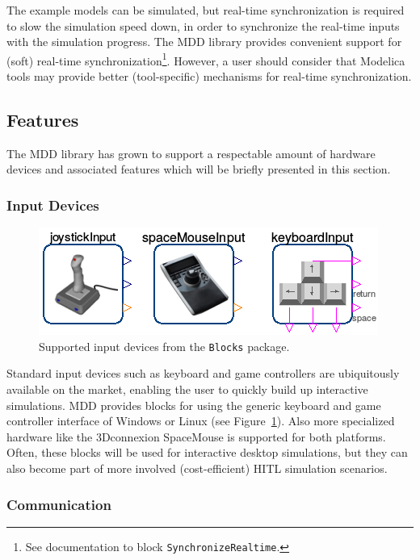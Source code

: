 \documentclass{resources/modelica}
\newcommand{\modelica}[1]{\lstinline[language=modelica]|#1|}
\begin{document}
\noindent
The example models can be simulated, but real-time synchronization is
required to slow the simulation speed down, in order to synchronize the
real-time inputs with the simulation progress.
The MDD library provides convenient support for (soft) real-time
synchronization\footnote{See documentation to block
\mbox{\modelica{SynchronizeRealtime}.}
}.
However, a user should consider that Modelica tools may provide better (tool-specific) mechanisms for real-time synchronization.

\subsection{Features}

The MDD library has grown to support a respectable amount of hardware devices
and associated features which will be briefly presented in this section.

\subsubsection{Input Devices}
\begin{figure}[htb]
  \centering
  \includegraphics[width=0.7\columnwidth]{figures/OverviewInputDevices}
  \caption{Supported input devices from the \modelica{Blocks} package.}
  \label{fig:OverviewInputDevices}
\end{figure}

\noindent
Standard input devices such as keyboard and game controllers are ubiquitously
available on the market, enabling the user to quickly build up interactive simulations.
MDD provides blocks for using the generic keyboard and game controller interface
of Windows or Linux (see Figure~\ref{fig:OverviewInputDevices}). Also more
specialized hardware like the 3Dconnexion SpaceMouse is supported for both platforms.
Often, these blocks will be used for interactive desktop simulations, but they
can also become part of more involved (cost-efficient) HITL simulation
scenarios.

\subsubsection{Communication}
\label{sec:Communication}
\end{document}
